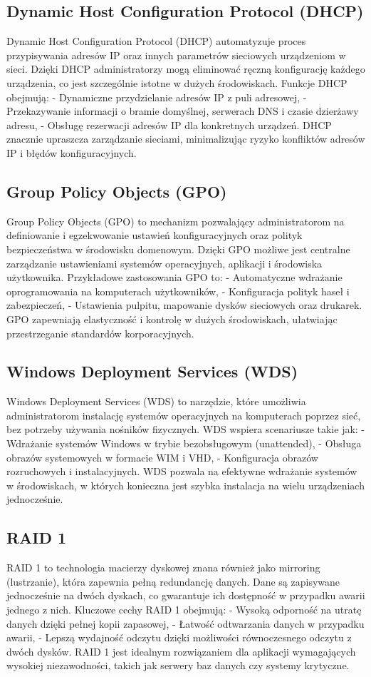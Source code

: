 \subsection{Dynamic Host Configuration Protocol (DHCP)}
Dynamic Host Configuration Protocol (DHCP) automatyzuje proces przypisywania adresów IP oraz innych parametrów sieciowych urządzeniom w sieci. Dzięki DHCP administratorzy mogą eliminować ręczną konfigurację każdego urządzenia, co jest szczególnie istotne w dużych środowiskach. Funkcje DHCP obejmują:
- Dynamiczne przydzielanie adresów IP z puli adresowej,
- Przekazywanie informacji o bramie domyślnej, serwerach DNS i czasie dzierżawy adresu,
- Obsługę rezerwacji adresów IP dla konkretnych urządzeń.
DHCP znacznie upraszcza zarządzanie sieciami, minimalizując ryzyko konfliktów adresów IP i błędów konfiguracyjnych.

\subsection{Group Policy Objects (GPO)}
Group Policy Objects (GPO) to mechanizm pozwalający administratorom na definiowanie i egzekwowanie ustawień konfiguracyjnych oraz polityk bezpieczeństwa w środowisku domenowym. Dzięki GPO możliwe jest centralne zarządzanie ustawieniami systemów operacyjnych, aplikacji i środowiska użytkownika. Przykładowe zastosowania GPO to:
- Automatyczne wdrażanie oprogramowania na komputerach użytkowników,
- Konfiguracja polityk haseł i zabezpieczeń,
- Ustawienia pulpitu, mapowanie dysków sieciowych oraz drukarek.
GPO zapewniają elastyczność i kontrolę w dużych środowiskach, ułatwiając przestrzeganie standardów korporacyjnych.

\subsection{Windows Deployment Services (WDS)}
Windows Deployment Services (WDS) to narzędzie, które umożliwia administratorom instalację systemów operacyjnych na komputerach poprzez sieć, bez potrzeby używania nośników fizycznych. WDS wspiera scenariusze takie jak:
- Wdrażanie systemów Windows w trybie bezobsługowym (unattended),
- Obsługa obrazów systemowych w formacie WIM i VHD,
- Konfiguracja obrazów rozruchowych i instalacyjnych.
WDS pozwala na efektywne wdrażanie systemów w środowiskach, w których konieczna jest szybka instalacja na wielu urządzeniach jednocześnie.

\subsection{RAID 1}
RAID 1 to technologia macierzy dyskowej znana również jako mirroring (lustrzanie), która zapewnia pełną redundancję danych. Dane są zapisywane jednocześnie na dwóch dyskach, co gwarantuje ich dostępność w przypadku awarii jednego z nich. Kluczowe cechy RAID 1 obejmują:
- Wysoką odporność na utratę danych dzięki pełnej kopii zapasowej,
- Łatwość odtwarzania danych w przypadku awarii,
- Lepszą wydajność odczytu dzięki możliwości równoczesnego odczytu z dwóch dysków.
RAID 1 jest idealnym rozwiązaniem dla aplikacji wymagających wysokiej niezawodności, takich jak serwery baz danych czy systemy krytyczne.


